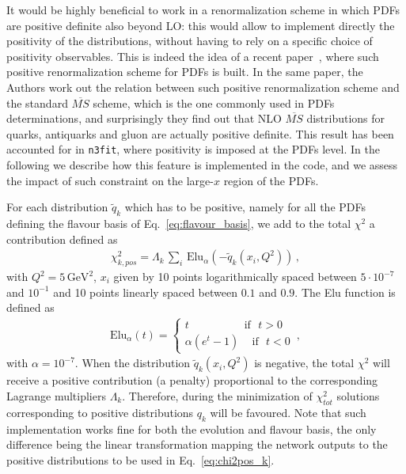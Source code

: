 %
It would be highly beneficial to work in a renormalization scheme in which PDFs are positive definite
also beyond LO: this would allow to implement directly the positivity of the distributions,
without having to rely on a specific choice of positivity observables.
This is indeed the idea of a recent paper~\cite{Candido:2020yat}, where such positive renormalization
scheme for PDFs is built. In the same paper, the Authors work out the relation between such positive
renormalization scheme and the standard $\overline{MS}$ scheme, which is the one commonly used in 
PDFs determinations, and surprisingly they find out that NLO $\overline{MS}$ distributions
for quarks, antiquarks and gluon are actually positive definite.  
This result has been accounted for in {\tt n3fit}, where positivity is imposed at the PDFs level.
In the following we describe how this feature is implemented in the code, and we assess the impact of such constraint
on the large-$x$ region of the PDFs.

%
For each distribution $\tilde{q}_k$ which has to be positive, namely for all the PDFs defining the
flavour basis of Eq.~\eqref{eq:flavour_basis}, we add to the total $\chi^2$ a contribution defined as  
\begin{align}
	\label{eq:chi2pos_k}
	\chi^2_{k,pos} = \Lambda_k \,\sum_i \,\text{Elu}_{\alpha}\left(-\tilde{q}_k\left(x_i,Q^2\right)\right)\,,
\end{align}
with $Q^2 = 5\, \text{GeV}^2$, $x_i$ given by 10 points logarithmically spaced between $5\cdot10^{-7}$ and $10^{-1}$ and 10 points
linearly spaced between $0.1$ and $0.9$. The Elu function is defined as 
\begin{align}
	\label{eq:Elu}
	\text{Elu}_{\alpha}\left(t\right) = 
	\begin{cases}
		t \,\,\,\,\,\,\,\,\,\,\,\,\,\,\,\,\,\,\,\,\,\,\,\,\,\,\,\,\,\,\text{if}\,\,\,\, t>0 \\
		\alpha\left(e^t-1\right)\,\,\,\,\,\,\,\text{if}\,\,\,\, t<0
	\end{cases}\,,
\end{align} 
with $\alpha=10^{-7}$. 
When the distribution $\tilde{q}_k\left(x_i, Q^2\right)$ is negative, the total $\chi^2$ will receive a positive contribution
(a penalty) proportional to the corresponding Lagrange multipliers $\Lambda_k$. 
Therefore, during the minimization of $\chi^2_{tot}$ solutions corresponding to positive distributions $q_k$
will be favoured. Note that such implementation works fine for both the evolution and flavour basis, the only 
difference being the linear transformation mapping the network outputs to the positive distributions to be 
used in Eq.~\eqref{eq:chi2pos_k}.

